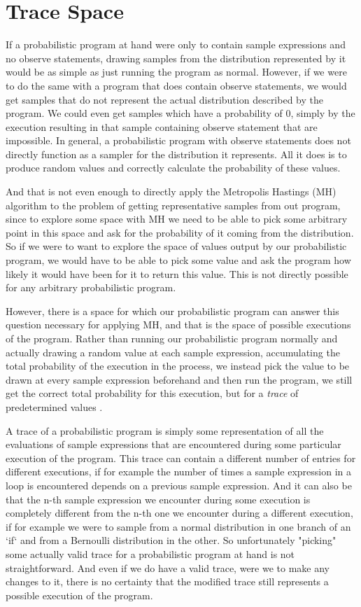 \section{Trace Space}

If a probabilistic program at hand were only to contain sample expressions and no observe statements, drawing samples from the distribution represented by it would be as simple as just running the program as normal. However, if we were to do the same with a program that does contain observe statements, we would get samples that do not represent the actual distribution described by the program. We could even get samples which have a probability of $0$, simply by the execution resulting in that sample containing observe statement that are impossible. In general, a probabilistic program with observe statements does not directly function as a sampler for the distribution it represents. All it does is to produce random values and correctly calculate the probability of these values.

And that is not even enough to directly apply the Metropolis Hastings (MH) algorithm to the problem of getting representative samples from out program, since to explore some space with MH we need to be able to pick some arbitrary point in this space and ask for the probability of it coming from the distribution. So if we were to want to explore the space of values output by our probabilistic program, we would have to be able to pick some value and ask the program how likely it would have been for it to return this value. This is not directly possible for any arbitrary probabilistic program.

However, there is a space for which our probabilistic program can answer this question necessary for applying MH, and that is the space of possible executions of the program. Rather than running our probabilistic program normally and actually drawing a random value at each sample expression, accumulating the total probability of the execution in the process, we instead pick the value to be drawn at every sample expression beforehand and then run the program, we still get the correct total probability for this execution, but for a \textit{trace} of predetermined values \cite{wingate2011lightweight}.

A trace of a probabilistic program is simply some representation of all the evaluations of sample expressions that are encountered during some particular execution of the program. This trace can contain a different number of entries for different executions, if for example the number of times a sample expression in a loop is encountered depends on a previous sample expression. And it can also be that the n-th sample expression we encounter during some execution is completely different from the n-th one we encounter during a different execution, if for example we were to sample from a normal distribution in one branch of an `if` and from a Bernoulli distribution in the other. So unfortunately "picking" some actually valid trace for a probabilistic program at hand is not straightforward. And even if we do have a valid trace, were we to make any changes to it, there is no certainty that the modified trace still represents a possible execution of the program.


